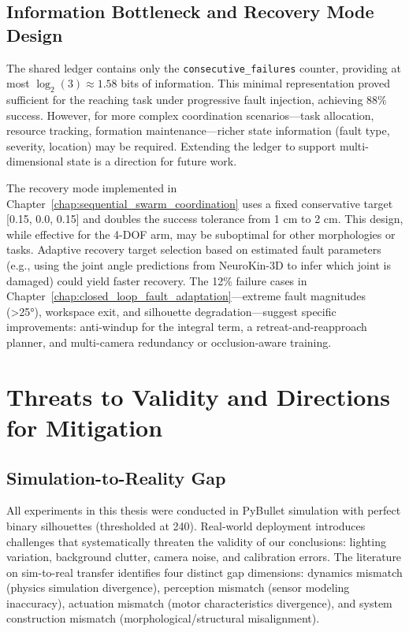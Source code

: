 \documentclass[12pt,a4paper,oneside]{report}
\begin{document}
\subsection{Information Bottleneck and Recovery Mode Design}
\label{subsec:information_bottleneck_and_recovery_mode_design}

The shared ledger contains only the \texttt{consecutive\_failures} counter, providing at most $\log_2(3) \approx 1.58$ bits of information. This minimal representation proved sufficient for the reaching task under progressive fault injection, achieving 88\% success. However, for more complex coordination scenarios—task allocation, resource tracking, formation maintenance—richer state information (fault type, severity, location) may be required. Extending the ledger to support multi-dimensional state is a direction for future work.

The recovery mode implemented in Chapter~\ref{chap:sequential_swarm_coordination} uses a fixed conservative target [0.15, 0.0, 0.15] and doubles the success tolerance from 1 cm to 2 cm. This design, while effective for the 4-DOF arm, may be suboptimal for other morphologies or tasks. Adaptive recovery target selection based on estimated fault parameters (e.g., using the joint angle predictions from NeuroKin-3D to infer which joint is damaged) could yield faster recovery. The 12\% failure cases in Chapter~\ref{chap:closed_loop_fault_adaptation}—extreme fault magnitudes (>25°), workspace exit, and silhouette degradation—suggest specific improvements: anti-windup for the integral term, a retreat-and-reapproach planner, and multi-camera redundancy or occlusion-aware training.

\section{Threats to Validity and Directions for Mitigation}

\subsection{Simulation-to-Reality Gap}
\label{subsec:simulation_to_reality_gap}

All experiments in this thesis were conducted in PyBullet simulation with perfect binary silhouettes (thresholded at 240). Real-world deployment introduces challenges that systematically threaten the validity of our conclusions: lighting variation, background clutter, camera noise, and calibration errors. The literature on sim-to-real transfer \cite{tan2018simtoreal, aljalbout2026realitygap} identifies four distinct gap dimensions: dynamics mismatch (physics simulation divergence), perception mismatch (sensor modeling inaccuracy), actuation mismatch (motor characteristics divergence), and system construction mismatch (morphological/structural misalignment).
\end{document}
